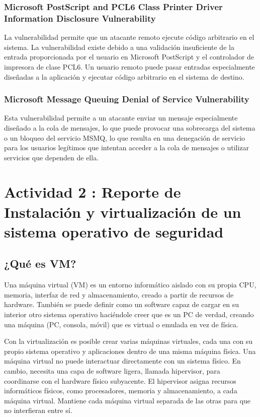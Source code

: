 \documentclass[stu, 11pt, letterpaper, donotrepeattitle, floatsintext, natbib]{apa7}
\begin{document}
\subsubsection{Microsoft PostScript and PCL6 Class Printer Driver Information Disclosure Vulnerability}

La vulnerabilidad permite que un atacante remoto ejecute código arbitrario en el sistema. La vulnerabilidad existe debido a una validación insuficiente de la entrada proporcionada por el usuario en Microsoft PostScript y el controlador de impresora de clase PCL6. Un usuario remoto puede pasar entradas especialmente diseñadas a la aplicación y ejecutar código arbitrario en el sistema de destino.

\subsubsection{Microsoft Message Queuing Denial of Service Vulnerability}

Esta vulnerabilidad permite a un atacante enviar un mensaje especialmente diseñado a la cola de mensajes, lo que puede provocar una sobrecarga del sistema o un bloqueo del servicio MSMQ, lo que resulta en una denegación de servicio para los usuarios legítimos que intentan acceder a la cola de mensajes o utilizar servicios que dependen de ella.

\newpage

\section{\large Actividad 2 : Reporte de Instalación y virtualización de un sistema operativo de seguridad}

\subsection{¿Qué es VM?} 

Una máquina virtual (VM) es un entorno informático aislado con su propia CPU, memoria, interfaz de red y almacenamiento, creado a partir de recursos de hardware. También se puede definir como un software capaz de cargar en su interior otro sistema operativo haciéndole creer que es un PC de verdad, creando una máquina (PC, consola, móvil) que es virtual o emulada en vez de física. 

Con la virtualización es posible crear varias máquinas virtuales, cada una con su propio sistema operativo y aplicaciones dentro de una misma máquina física. Una máquina virtual no puede interactuar directamente con un sistema físico. En cambio, necesita una capa de software ligera, llamada hipervisor, para coordinarse con el hardware físico subyacente. El hipervisor asigna recursos informáticos físicos, como procesadores, memoria y almacenamiento, a cada máquina virtual. Mantiene cada máquina virtual separada de las otras para que no interfieran entre sí. 
\end{document}
